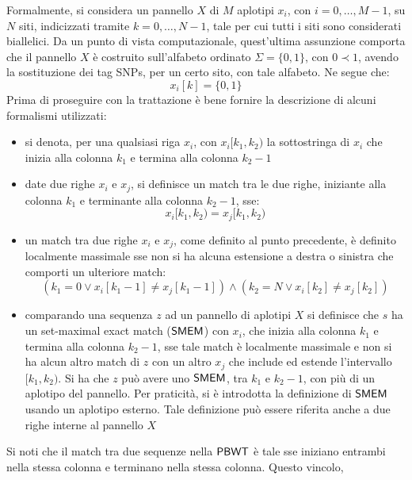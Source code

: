 Formalmente, si considera un pannello $X$ di $M$ aplotipi $x_i$, con
$i=0,\ldots, M-1$, su $N$ siti, indicizzati tramite $k=0,\ldots, N-1$, tale per
cui tutti i siti sono considerati biallelici. 
Da un punto di vista computazionale, quest'ultima
assunzione comporta che il pannello $X$ è costruito sull'alfabeto ordinato
$\Sigma =\{0,1\}$, con $0\prec 1$, avendo la sostituzione dei tag SNPs,
per un certo sito, con tale alfabeto. Ne segue che:
\begin{equation}
  \label{eq:pbwtdip}
  x_i[k]=\{0,1\}
\end{equation}
Prima di proseguire con la trattazione è bene fornire la descrizione di alcuni
formalismi utilizzati:
\begin{itemize}
  \item si denota, per una qualsiasi riga $x_i$, con $x_i[k_1,k_2)$ la
  sottostringa di $x_i$ che inizia alla colonna $k_1$ e termina alla
  colonna $k_2-1$
  \item date due righe $x_i$ e $x_j$, si definisce un match tra le due
  righe, iniziante
  alla colonna $k_1$ e terminante alla colonna $k_2-1$, sse:
  \begin{equation}
    \label{eq:pbwtmatch}
    x_i[k_1,k_2)=x_j[k_1,k_2)
  \end{equation}
  \item un match tra due righe $x_i$ e $x_j$, come definito al punto precedente,
  è definito localmente massimale sse non si ha alcuna estensione a
  destra o sinistra che comporti un ulteriore match:
  \begin{equation}
    \label{eq:pbwtmem}
    (k_1=0\lor x_i[k_1-1]\neq x_j[k_1-1])\land (k_2=N\lor x_i[k_2]\neq x_j[k_2])
  \end{equation}
  \item comparando una sequenza $z$ ad un pannello di aplotipi $X$ si definisce
  che $s$ ha un set-maximal exact match ($\mbox{\rm {\sf SMEM}}$) con $x_i$, che inizia
  alla colonna $k_1$ e termina alla colonna $k_2-1$, sse tale match è
  localmente massimale e non si ha alcun altro match di $z$ con un
  altro $x_j$ che include ed estende l'intervallo $[k_1,k_2)$. Si ha che $z$
  può avere uno $\mbox{\rm {\sf SMEM}}$, tra $k_1$ e $k_2-1$, con più di un aplotipo del
  pannello. Per praticità, si è introdotta la definizione di $\mbox{\rm {\sf SMEM}}$ usando un
  aplotipo esterno. Tale definizione può essere riferita anche a due righe
  interne al pannello $X$
\end{itemize}
Si noti che il match tra due sequenze nella $\mbox{\rm {\sf PBWT}}$ è tale sse iniziano
entrambi nella stessa colonna e terminano nella stessa colonna. Questo vincolo,
